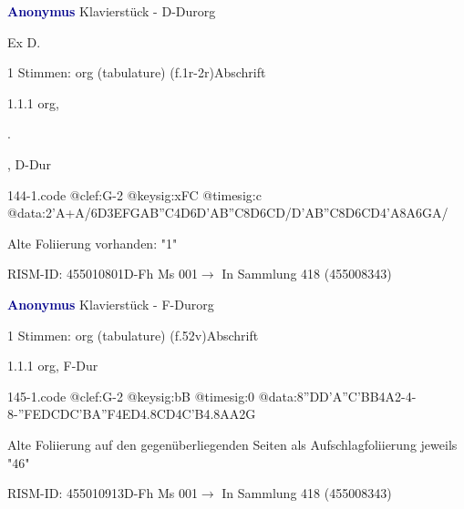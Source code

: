 \documentclass[twocolumn]{book}
\begin{document}
\par \vspace{7pt} \textcolor{darkblue}{\textbf{Anonymus  }}\hfillplus{\textbf{[144]}}\newline Klavierstück - D-Dur\newline org
\par \begin{itshape}[f.1r, at left:] Ex D.\end{itshape} 
\par \textcolor{darkblue}{}  1 Stimmen: org (tabulature)  (f.1r-2r)\newline Abschrift
\par 1.1.1  org, \begin{itshape}.\end{itshape}, D-Dur  
\begin{filecontents*}{144-1.code}
@clef:G-2
@keysig:xFC
@timesig:c
@data:2'A+A/{6D3EF}{GAB''C}4D{6D'AB''C}{8D6CD}/{D'AB''C}{8D6CD}4'A{8A6GA}/
\end{filecontents*}
\newline
%
\par Alte Foliierung vorhanden: "1"
\par RISM-ID: 455010801\newline D-Fh  Ms 001\newline $\rightarrow$ In Sammlung 418 (455008343)
      
\par \vspace{7pt} \textcolor{darkblue}{\textbf{Anonymus  }}\hfillplus{\textbf{[145]}}\newline Klavierstück - F-Dur\newline org
\par \begin{itshape}\end{itshape} 
\par \textcolor{darkblue}{}  1 Stimmen: org (tabulature)  (f.52v)\newline Abschrift
\par 1.1.1  org, F-Dur  
\begin{filecontents*}{145-1.code}
@clef:G-2
@keysig:bB
@timesig:0
@data:{8''DD'A''C}{'BB}4A2-4-8-''F{EDCD}{C'BA''F}4ED4.8CD4C'B4.8AA2G
\end{filecontents*}
\newline
%
\par Alte Foliierung auf den gegenüberliegenden Seiten als Aufschlagfoliierung jeweils "46"
\par RISM-ID: 455010913\newline D-Fh  Ms 001\newline $\rightarrow$ In Sammlung 418 (455008343)
      
\end{document}

